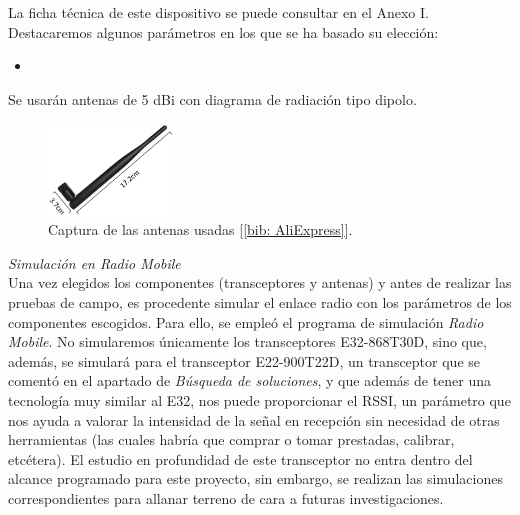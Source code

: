 \documentclass[12pt]{article}
\begin{document}
	\noindent La ficha técnica de este dispositivo se puede consultar en el Anexo I. Destacaremos algunos parámetros en los que se ha basado su elección: \\
	
	\begin{itemize}
		\item 
	\end{itemize}
	
	\noindent Se usarán antenas de 5 dBi con diagrama de radiación tipo dipolo.\\
	
	\begin{figure}[h]
		\begin{center}
			\includegraphics[width=0.3\textwidth]{img/antena_5dbi.png}
			\caption{Captura de las antenas usadas [\ref{bib: AliExpress}].}
			\label{Captura antenas 5dbi}
		\end{center}
	\end{figure}
	
	\noindent \textit{Simulación en Radio Mobile}\\
	
	\noindent Una vez elegidos los componentes (transceptores y antenas) y antes de realizar las pruebas de campo, es procedente simular el enlace radio con los parámetros de los componentes escogidos. Para ello, se empleó el programa de simulación \textit{Radio Mobile}. No simularemos únicamente los transceptores E32-868T30D, sino que, además, se simulará para el transceptor E22-900T22D, un transceptor que se comentó en el apartado de \textit{Búsqueda de soluciones}, y que además de tener una tecnología muy similar al E32, nos puede proporcionar el RSSI, un parámetro que nos ayuda a valorar la intensidad de la señal en recepción sin necesidad de otras herramientas (las cuales habría que comprar o tomar prestadas, calibrar, etcétera). El estudio en profundidad de este transceptor no entra dentro del alcance programado para este proyecto, sin embargo, se realizan las simulaciones correspondientes para allanar terreno de cara a futuras investigaciones.\\
	
\end{document}
